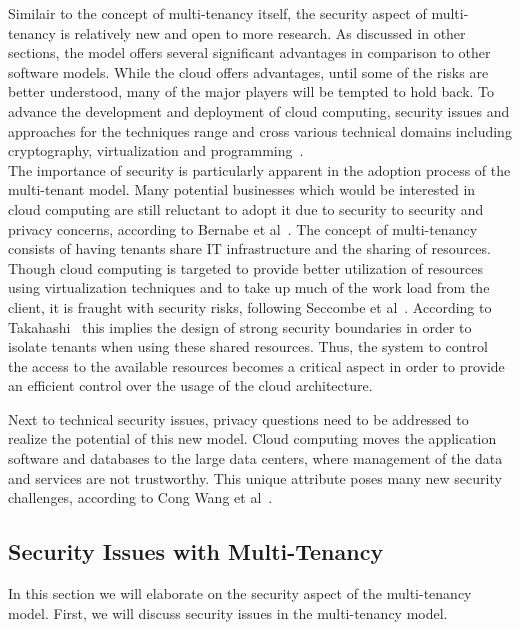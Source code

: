Similair to the concept of multi-tenancy itself, the security aspect of multi-tenancy is relatively new and open to more research. 
As discussed in other sections, the model offers several significant advantages in comparison to other software models. 
While the cloud offers advantages, until some of the risks are better understood, many of the major players will be tempted to hold back. 
To advance the development and deployment of cloud computing, security issues and approaches for the techniques range and cross various technical domains including cryptography, virtualization and programming~\cite{Takahashi2012Security}. \\

The importance of security is particularly apparent in the adoption process of the multi-tenant model. 
Many potential businesses which would be interested in cloud computing are still reluctant to adopt it due to security to security and privacy concerns, according to Bernabe et al~\cite{Bernabe2012Auth}. 
The concept of multi-tenancy consists of having tenants share IT infrastructure and the sharing of resources. 
Though cloud computing is targeted to provide better utilization of resources using virtualization techniques and to take up much of the work load from the client, it is fraught with security risks, following Seccombe et al~\cite{Seccombe2009Security}. 
According to Takahashi~\cite{Takahashi2012Security} this implies the design of strong security boundaries in order to isolate tenants when using these shared resources. 
Thus, the system to control the access to the available resources becomes a critical aspect in order to provide an efficient control over the usage of the cloud architecture.

Next to technical security issues, privacy questions need to be addressed to realize the potential of this new model. 
Cloud computing moves the application software and databases to the large data centers, where management of the data and services are not trustworthy. 
This unique attribute poses many new security challenges, according to Cong Wang et al~\cite{Wang2009Security}. 

\subsection{Security Issues with Multi-Tenancy}
In this section we will elaborate on the security aspect of the multi-tenancy model. 
First, we will discuss security issues in the multi-tenancy model.

